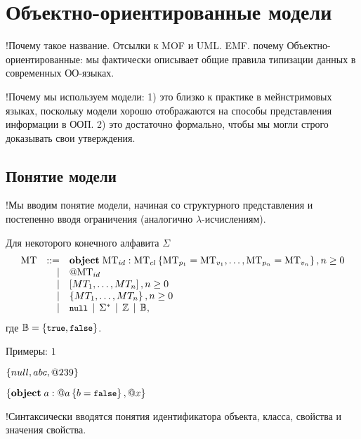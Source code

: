 \chapter{Объектно-ориентированные модели}

!Почему такое название. Отсылки к MOF и UML. EMF. 
почему Объектно-ориентированные: мы фактически описывает общие правила типизации данных в современных ОО-языках.

!Почему мы используем модели: 
1) это близко к практике в мейнстримовых языках, поскольку модели хорошо отображаются на способы представления информации в ООП. 
2) это достаточно формально, чтобы мы могли строго доказывать свои утверждения.

\section{Понятие модели}

!Мы вводим понятие модели, начиная со структурного представления и постепенно вводя ограничения (аналогично $\lambda$-исчислениям).


\begin{Def}
Для некоторого конечного алфавита $\Sigma$
\[
\begin{array}{rrl}
	\mbox{MT} & ::= & \mathbf{object}\;\mbox{MT}_{id} : \mbox{MT}_{cl} \left\{ \mbox{MT}_{p_1}=\mbox{MT}_{v_1},\ldots,\mbox{MT}_{p_n}=\mbox{MT}_{v_n} \right\}, n \ge 0 \\ 
	           &   | & @\mbox{MT}_{id} \\ 
	           &   | & \left[MT_1,\ldots,MT_n\right], n \ge 0 \\ 
	           &   | & \left\{MT_1,\ldots,MT_n\right\}, n \ge 0 \\ 
	           &   | & \mbox{\small \tt null} \;\,|\;\,  \Sigma^{*} \;\,|\;\, \mathbb{Z} \;\,|\;\, \mathbb{B}, \\
\end{array}
\]
где $\mathbb{B} = \left\{ \mbox{\small \tt true}, \mbox{\small \tt false} \right\}$.
\end{Def}

Примеры:
$1$

$\left\{null, abc, @239\right\}$

$\left\{\mathbf{object}\;a : @a \left\{ b=\mbox{\small \tt false} \right\}, @x\right\}$

!Синтаксически вводятся понятия идентификатора объекта, класса, свойства и значения свойства.

